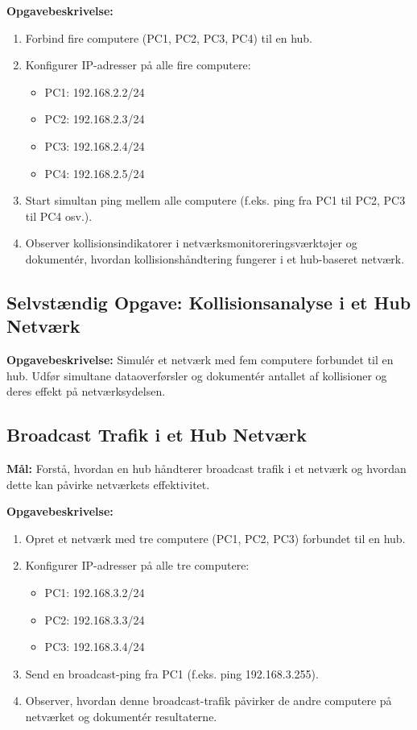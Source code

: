\textbf{Opgavebeskrivelse:}
\begin{enumerate}
	\item Forbind fire computere (PC1, PC2, PC3, PC4) til en hub.
	\item Konfigurer IP-adresser på alle fire computere:
	\begin{itemize}
		\item PC1: 192.168.2.2/24
		\item PC2: 192.168.2.3/24
		\item PC3: 192.168.2.4/24
		\item PC4: 192.168.2.5/24
	\end{itemize}
	\item Start simultan ping mellem alle computere (f.eks. ping fra PC1 til PC2, PC3 til PC4 osv.).
	\item Observer kollisionsindikatorer i netværksmonitoreringsværktøjer og dokumentér, hvordan kollisionshåndtering fungerer i et hub-baseret netværk.
\end{enumerate}

\subsection*{Selvstændig Opgave: Kollisionsanalyse i et Hub Netværk}
\textbf{Opgavebeskrivelse:} Simulér et netværk med fem computere forbundet til en hub. Udfør simultane dataoverførsler og dokumentér antallet af kollisioner og deres effekt på netværksydelsen.

\subsection*{Broadcast Trafik i et Hub Netværk}
\textbf{Mål:} Forstå, hvordan en hub håndterer broadcast trafik i et netværk og hvordan dette kan påvirke netværkets effektivitet.

\textbf{Opgavebeskrivelse:}
\begin{enumerate}
	\item Opret et netværk med tre computere (PC1, PC2, PC3) forbundet til en hub.
	\item Konfigurer IP-adresser på alle tre computere:
	\begin{itemize}
		\item PC1: 192.168.3.2/24
		\item PC2: 192.168.3.3/24
		\item PC3: 192.168.3.4/24
	\end{itemize}
	\item Send en broadcast-ping fra PC1 (f.eks. ping 192.168.3.255).
	\item Observer, hvordan denne broadcast-trafik påvirker de andre computere på netværket og dokumentér resultaterne.
\end{enumerate}


